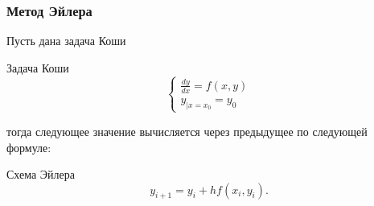 \documentclass[t]{beamer}
\begin{document}
\begin{frame}
    \frametitle{Метод Эйлера}
    Пусть дана задача Коши
    \begin{block}{Задача Коши}
        \begin{equation*}
            \begin{cases}
                \frac{dy}{dx} = f(x,y) \\
                y_{|x=x_0} = y_0
            \end{cases}
        \end{equation*}
    \end{block}
    тогда следующее значение вычисляется через предыдущее по следующей формуле:
    \begin{block}{Схема Эйлера}
        \begin{equation*}
            y_{i+1} = y_i + hf(x_i, y_i).
        \end{equation*}
    \end{block}
\end{frame}
\end{document}
